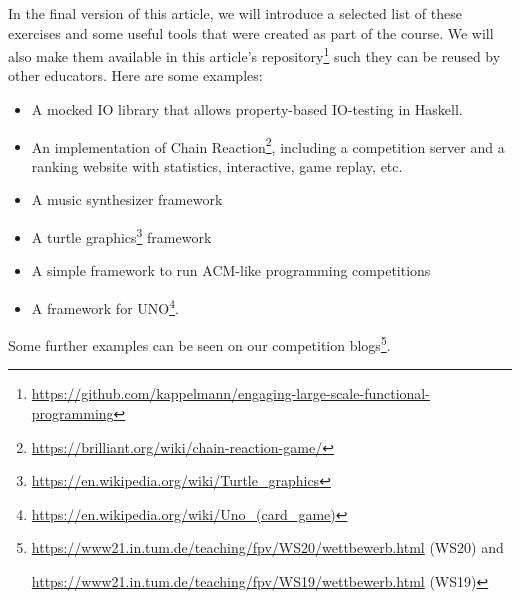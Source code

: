 In the final version of this article,
we will introduce a selected list of
these exercises and some useful tools
that were created as part of the course.
We will also make them available in this article's repository\footnote{\url{https://github.com/kappelmann/engaging-large-scale-functional-programming}}
such they can be reused by other educators.
Here are some examples:
\begin{itemize}
\item A mocked IO library that allows property-based IO-testing in Haskell.
\item An implementation of Chain Reaction\footnote{\url{ https://brilliant.org/wiki/chain-reaction-game/}},
including a competition server
and a ranking website with statistics,
interactive, game replay, etc.
\item A music synthesizer framework
\item A turtle graphics\footnote{\url{https://en.wikipedia.org/wiki/Turtle_graphics}} framework
\item A simple framework to run ACM-like programming competitions
\item A framework for UNO\footnote{\url{https://en.wikipedia.org/wiki/Uno_(card_game)}}.
\end{itemize}
Some further examples can be seen on our competition blogs\footnote{\url{https://www21.in.tum.de/teaching/fpv/WS20/wettbewerb.html} (WS20) and

\url{https://www21.in.tum.de/teaching/fpv/WS19/wettbewerb.html} (WS19)}.



